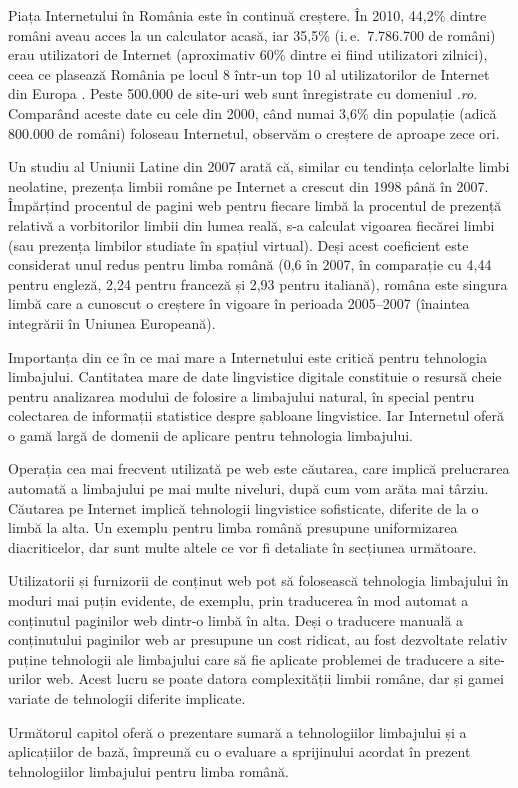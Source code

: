 \begin{multicols}{2}
Piața Internetului în România este în continuă creștere. În 2010, 44,2\% dintre români aveau acces la un calculator acasă, iar 35,5\% (i.\,e.~7.786.700 de români) erau utilizatori de Internet \cite{urlInternetStatsRO} (aproximativ 60\% dintre ei fiind utilizatori zilnici), ceea ce plasează România pe locul 8 într-un top 10 al utilizatorilor de Internet din Europa \cite{urlInternetStatsEU}. Peste 500.000 de site-uri web sunt înregistrate cu domeniul \textit{.ro}. Comparând aceste date cu cele din 2000, când numai 3,6\% din populație (adică 800.000 de români) foloseau Internetul, observăm o creștere de aproape zece ori.

Un studiu al Uniunii Latine din 2007 \cite{uniunealat} arată că, similar cu tendința celorlalte limbi neolatine, prezența limbii române pe Internet a crescut din 1998 până în 2007. Împărțind procentul de pagini web pentru fiecare limbă la procentul de prezență relativă a vorbitorilor limbii din lumea reală, s-a calculat vigoarea fiecărei limbi (sau prezența limbilor studiate în spațiul virtual). Deși acest coeficient este considerat unul redus pentru limba română (0,6 în 2007, în comparație cu 4,44 pentru engleză, 2,24 pentru franceză și 2,93 pentru italiană), româna este singura limbă care a cunoscut o creștere în vigoare în perioada 2005--2007 (înaintea integrării în Uniunea Europeană).


Importanța din ce în ce mai mare a Internetului este critică pentru tehnologia limbajului. Cantitatea mare de date lingvistice digitale constituie o resursă cheie pentru analizarea modului de folosire a limbajului natural, în special pentru colectarea de informații statistice despre șabloane lingvistice. Iar Internetul oferă o gamă largă de domenii de aplicare pentru tehnologia limbajului.

Operația cea mai frecvent utilizată pe web este căutarea, care implică prelucrarea automată a limbajului pe mai multe niveluri, după cum vom arăta mai târziu. Căutarea pe Internet implică tehnologii lingvistice sofisticate, diferite de la o limbă la alta. Un exemplu pentru limba română presupune uniformizarea diacriticelor, dar sunt multe altele ce vor fi detaliate în secțiunea următoare.

Utilizatorii și furnizorii de conținut web pot să folosească tehnologia limbajului în moduri mai puțin evidente, de exemplu, prin traducerea în mod automat a conținutul paginilor web dintr-o limbă în alta. Deși o traducere manuală a conținutului paginilor web ar presupune un cost ridicat, au fost dezvoltate relativ puține tehnologii ale limbajului care să fie aplicate problemei de traducere a site-urilor web. Acest lucru se poate datora complexității limbii române, dar și gamei variate de tehnologii diferite implicate.

Următorul capitol oferă o prezentare sumară a tehnologiilor limbajului și a aplicațiilor de bază, împreună cu o evaluare a sprijinului acordat în prezent tehnologiilor limbajului pentru limba română.

\end{multicols}

